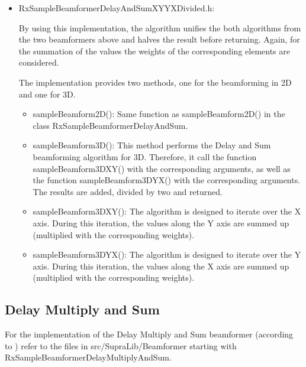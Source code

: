 \documentclass[12pt,a4paper,oneside]{scrartcl}
\begin{document}
\begin{itemize}
  \item RxSampleBeamformerDelayAndSumXYYXDivided.h:

    By using this implementation, the algorithm unifies the both algorithms from the two beamformers above and halves the result before returning.
    Again, for the summation of the values the weights of the corresponding elements are considered.

    The implementation provides two methods, one for the beamforming in 2D and one for 3D.
      \begin{itemize}
        \item sampleBeamform2D():
          Same function as sampleBeamform2D() in the class RxSampleBeamformerDelayAndSum.
        \item sampleBeamform3D():
          This method performs the Delay and Sum beamforming algorithm for 3D.
          Therefore, it call the function sampleBeamform3DXY() with the corresponding arguments, as well as the function sampleBeamform3DYX() with the corresponding arguments.
          The results are added, divided by two and returned.
        \item sampleBeamform3DXY():
          The algorithm is designed to iterate over the X axis.
          During this iteration, the values along the Y axis are summed up (multiplied with the corresponding weights).
        \item sampleBeamform3DYX():
          The algorithm is designed to iterate over the Y axis.
          During this iteration, the values along the X axis are summed up (multiplied with the corresponding weights).
      \end{itemize}
\end{itemize}

\subsection{Delay Multiply and Sum}
For the implementation of the Delay Multiply and Sum beamformer (according to \cite{articleAboutSDMAS}) refer to the files in src/SupraLib/Beamformer starting with RxSampleBeamformerDelayMultiplyAndSum.
\end{document}
